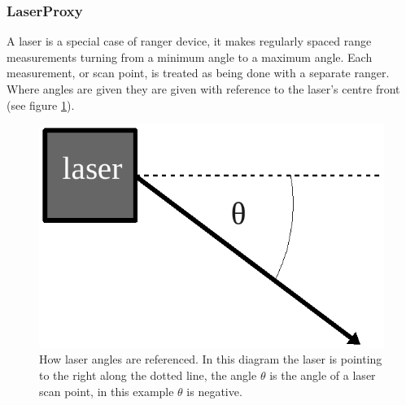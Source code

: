\documentclass[a4paper]{report}
\begin{document}
\subsubsection{LaserProxy}
A laser is a special case of ranger device, it makes regularly spaced range measurements turning from a minimum angle to a maximum angle. Each measurement, or scan point, is treated as being done with a separate ranger. Where angles are given they are given with reference to the laser's centre front (see figure \ref{fig:laserangles}).


\begin{figure}
	\centering
	\includegraphics[width=0.8\linewidth]{./pics/coding/laserscanner2.png}
	\caption{How laser angles are referenced. In this diagram the laser is pointing to the right along the dotted line, the angle $\theta$ is the angle of a laser scan point, in this example $\theta$ is negative.}
	\label{fig:laserangles}
\end{figure} 
\end{document}
